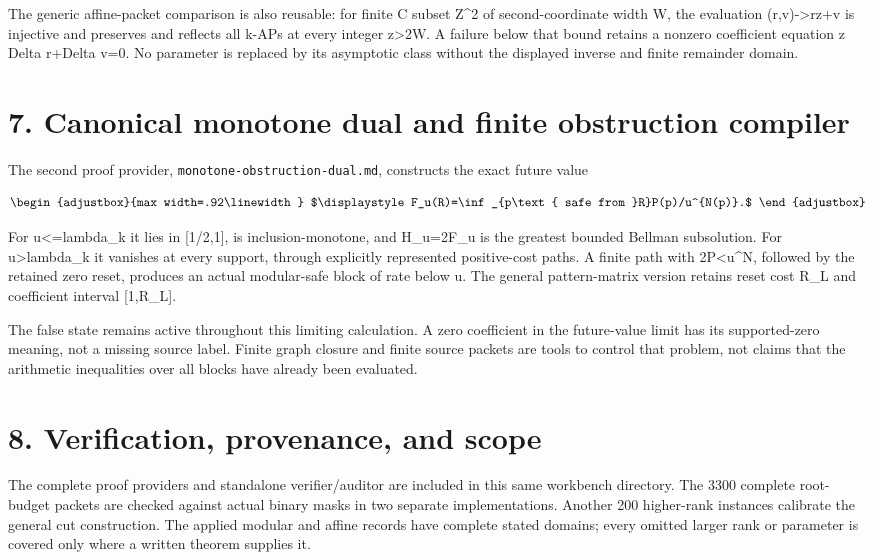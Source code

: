 The generic affine-packet comparison is also reusable: for finite C subset Z\^{}2 of second-coordinate width W, the evaluation (r,v)-\textgreater rz+v is injective and preserves and reflects all k-APs at every integer z\textgreater2W. A failure below that bound retains a nonzero coefficient equation z Delta r+Delta v=0. No parameter is replaced by its asymptotic class without the displayed inverse and finite remainder domain.

\section{7. Canonical monotone dual and finite obstruction compiler}\label{n10-canonical-monotone-dual-and-finite-obstruction-compiler}

The second proof provider, \texttt{monotone-obstruction-dual.md}, constructs the exact future value

\[
\begin{adjustbox}{max width=.92\linewidth}
$\displaystyle F_u(R)=\inf_{p\text{ safe from }R}P(p)/u^{N(p)}.$
\end{adjustbox}
\]

For u\textless=lambda\_k it lies in {[}1/2,1{]}, is inclusion-monotone, and H\_u=2F\_u is the greatest bounded Bellman subsolution. For u\textgreater lambda\_k it vanishes at every support, through explicitly represented positive-cost paths. A finite path with 2P\textless u\^{}N, followed by the retained zero reset, produces an actual modular-safe block of rate below u. The general pattern-matrix version retains reset cost R\_L and coefficient interval {[}1,R\_L{]}.

The false state remains active throughout this limiting calculation. A zero coefficient in the future-value limit has its supported-zero meaning, not a missing source label. Finite graph closure and finite source packets are tools to control that problem, not claims that the arithmetic inequalities over all blocks have already been evaluated.

\section{8. Verification, provenance, and scope}\label{n10-verification-provenance-and-scope}

The complete proof providers and standalone verifier/auditor are included in this same workbench directory. The 3300 complete root-budget packets are checked against actual binary masks in two separate implementations. Another 200 higher-rank instances calibrate the general cut construction. The applied modular and affine records have complete stated domains; every omitted larger rank or parameter is covered only where a written theorem supplies it.


